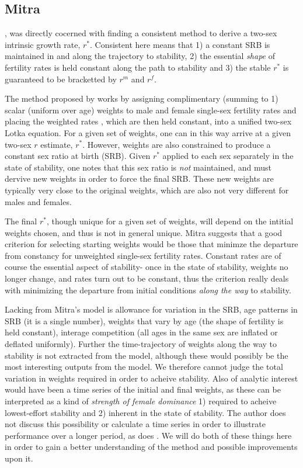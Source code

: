 \subsection{Mitra}

\citet{mitra1978derivation}, was directly cocerned with finding a consistent
method to derive a two-sex intrinsic growth rate, $r^\ast$. Consistent here
means that 1) a constant SRB is maintained in and along the trajectory to stability, 2) the
essential \textit{shape} of fertility rates is held constant along the path to
stability and 3) the stable $r^\ast$ is guaranteed to be bracketted by $r^m$ and
$r^f$.

The method proposed by \citet{mitra1978derivation} works by assigning
complimentary (summing to 1) scalar (uniform over age) weights to male and
female single-sex fertility rates and placing the weighted rates , which are
then held constant, into a unified two-sex Lotka equation. For a given set of
weights, one can in this way arrive at a given two-sex $r$ estimate, $r^\ast$. 
However, weights are also constrained to produce a constant 
sex ratio at birth (SRB). Given $r^\ast$ applied to each sex separately in the
state of stability, one notes that this sex ratio is \textit{not} maintained, and must dervive new weights
in order to force the final SRB. These new weights are typically very close to
the original weights, which are also not very different for males and females.

The final $r^\ast$, though unique for a given set of weights, will
depend on the intitial weights chosen, and thus is not in general unique. Mitra
suggests that a good criterion for selecting starting weights would be those
that minimze the departure from constancy for unweighted single-sex fertility
rates. Constant rates are of course the essential aspect of stability- once in
the state of stability, weights no longer change, and rates turn out to be
constant, thus the criterion really deals with minimizing the departure from
initial conditions \textit{along the way} to stability.

Lacking from Mitra's model is allowance for variation in the SRB, age patterns
in SRB (it is a single number), weights that vary by age (the shape of
fertility is held constant), interage competition (all ages in the same sex are
inflated or deflated uniformly). Further the time-trajectory of weights along
the way to stability is not extracted from the model, although these would
possibly be the most interesting outputs from the model. We therefore cannot
judge the total variation in weights required in order to acheive stability.
Also of analytic interest would have been a time series of the initial and final
weights, as these can be interpreted as a kind of \textit{strength of female
dominance} 1) required to acheive lowest-effort stability and 2) inherent in
the state of stability. The author does not discuss this possibility or
calculate a time series in order to illustrate performance over a longer 
period, as does \citet{gupta1973, gupta1978general}. We will do both of these
things here in order to gain a better understanding of the method and possible
improvements upon it.

